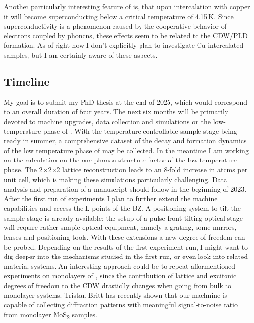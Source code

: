 Another particularly interesting feature of \ts\space is, that upon intercalation with copper it will become superconducting below a critical temperature of 4.15\,K\cite{morosan2006}.
Since superconductivity is a phenomenon caused by the cooperative behavior of electrons coupled by phonons, these effects seem to be related to the \ac{CDW}/\ac{PLD} formation.
As of right now I don't explicitly plan to investigate Cu-intercalated samples, but I am certainly aware of these aspects.

\subsection*{Timeline}
My goal is to submit my PhD thesis at the end of 2025, which would correspond to an overall duration of four years.
The next six months will be primarily devoted to machine upgrades, data collection and simulations on the low-temperature phase of \ts.
With the temperature controllable sample stage being ready in summer, a comprehensive dataset of the decay and formation dynamics of the low temperature phase of \ts may be collected.
In the meantime I am working on the calculation on the one-phonon structure factor of the low temperature phase.
The 2$\times$2$\times$2 lattice reconstruction leads to an 8-fold increase in atoms per unit cell, which is making these simulations particularly challenging.
Data analysis and preparation of a manuscript should follow in the beginning of 2023.
After the first run of experiments I plan to further extend the machine capabilities and access the L points of the \ac{BZ}.
A positioning system to tilt the sample stage is already available; the setup of a pulse-front tilting optical stage will require rather simple optical equipment, namely a grating, some mirrors, lenses and positioning tools.
With these extensions a new degree of freedom can be probed.
Depending on the results of the first experiment run, I might want to dig deeper into the mechanisms studied in the first run, or even look into related material systems.
An interesting approach could be to repeat afformentioned experiments on monolayers of \ts, since the contribution of lattice and excitonic degrees of freedom to the \ac{CDW} drasticlly changes when going from bulk to monolayer systems.
Tristan Britt has recently shown that our machnine is capable of collecting diffraction patterns with meaningful signal-to-noise ratio from monolayer MoS\textsubscript{2} samples.